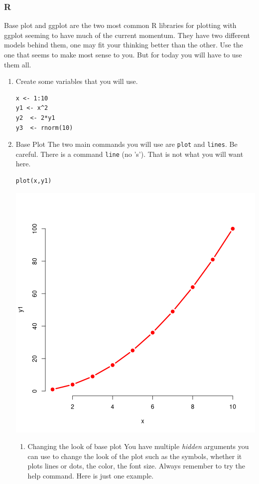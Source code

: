 \documentclass{article}
\begin{document}
\subsubsection{R}
\label{sec:org1a2712c}
Base plot and ggplot are the two most common R libraries for plotting with ggplot seeming to have much of the current momentum. They have two different models behind them, one may fit your thinking better than the other. Use the one that seems to make most sense to you. But for today you will have to use them all.
\begin{enumerate}
\item Create some variables that you will use.
\label{sec:org24204cb}
\begin{verbatim}
x <- 1:10
y1 <- x^2
y2  <- 2*y1
y3  <- rnorm(10)
\end{verbatim}
\item Base Plot
\label{sec:orgb5e6796}
The two main commands you will use are \texttt{plot} and \texttt{lines}. Be careful. There is a command \texttt{line} (no 's'). That is not what you will want here.
\begin{verbatim}
plot(x,y1)
\end{verbatim}

\begin{center}
\includegraphics[width=.9\linewidth]{baseplot1.png}
\end{center}
\begin{enumerate}
\item Changing the look of base plot
\label{sec:org4983280}
You have multiple \emph{hidden} arguments you can use to change the look of the plot such as the symbols, whether it plots lines or dots, the color, the font size. Always remember to try the help command. Here is just one example.


\end{enumerate}
\end{enumerate}
\end{document}
